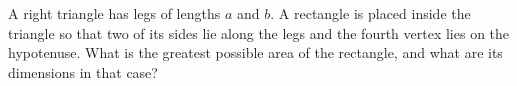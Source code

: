 A right triangle has legs of lengths $a$ and $b$. A rectangle is placed inside the triangle so that two of its sides lie along the legs and the fourth vertex lies on the hypotenuse. What is the greatest possible area of the rectangle, and what are its dimensions in that case?
